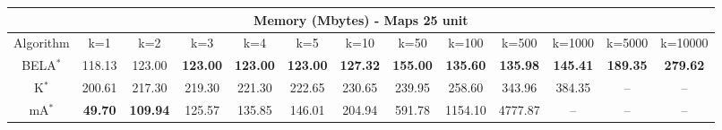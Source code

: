 \begin{tabular}{c|cccccccccccc}\toprule
\multicolumn{13}{c}{Memory (Mbytes) - Maps 25 unit}\\ \midrule
Algorithm & k=1 & k=2 & k=3 & k=4 & k=5 & k=10 & k=50 & k=100 & k=500 & k=1000 & k=5000 & k=10000 \\ \midrule
BELA$^*$ & 118.13 & 123.00 & \textbf{123.00} & \textbf{123.00} & \textbf{123.00} & \textbf{127.32} & \textbf{155.00} & \textbf{135.60} & \textbf{135.98} & \textbf{145.41} & \textbf{189.35} & \textbf{279.62} \\
K$^*$ & 200.61 & 217.30 & 219.30 & 221.30 & 222.65 & 230.65 & 239.95 & 258.60 & 343.96 & 384.35 & -- & -- \\
mA$^*$ & \textbf{49.70} & \textbf{109.94} & 125.57 & 135.85 & 146.01 & 204.94 & 591.78 & 1154.10 & 4777.87 & -- & -- & -- \\ \bottomrule 
\end{tabular}
